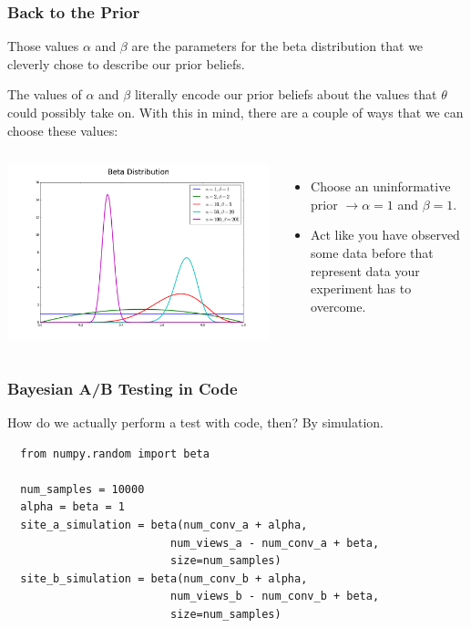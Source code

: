 \documentclass{beamer}
\begin{document}
\begin{frame}
  \frametitle{Back to the Prior}
  Those values $\alpha$ and $\beta$ are the parameters for the beta distribution that we cleverly chose to describe our prior beliefs. \vspace{2mm}

  The values of $\alpha$ and $\beta$ literally encode our prior beliefs about the values that $\theta$ could possibly take on. With this in mind, there are a couple of ways that we can choose these values: \vspace{2mm}
  \begin{columns}
      \includegraphics[width=1.2\textwidth]{images/betas.png}
      \pause

      \begin{itemize}
        \item {\small Choose an uninformative prior $\rightarrow \alpha = 1$ and $\beta = 1$.} \pause
        \item {\small Act like you have observed some data before that represent data your experiment has to overcome.}
      \end{itemize}
  \end{columns}
\end{frame}

\begin{frame}[fragile]
  \frametitle{Bayesian A/B Testing in Code}
  How do we actually perform a test with code, then? By simulation. \vspace{4mm}
  \begin{lstlisting}
  from numpy.random import beta

  num_samples = 10000
  alpha = beta = 1
  site_a_simulation = beta(num_conv_a + alpha,
                         num_views_a - num_conv_a + beta,
                         size=num_samples)
  site_b_simulation = beta(num_conv_b + alpha,
                         num_views_b - num_conv_b + beta,
                         size=num_samples)
  \end{lstlisting}
\end{frame}
\end{document}
